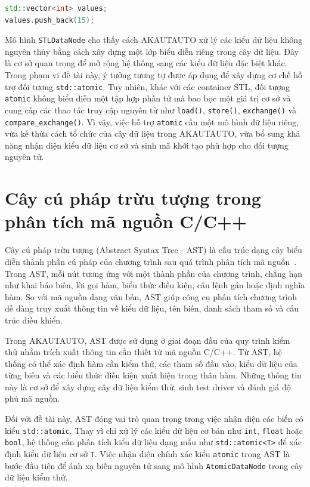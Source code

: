 \begin{lstlisting}[language=C++,caption={Ví dụ mã khởi tạo dữ liệu kiểm thử cho vector},label={lst:stl_vector_init}]
std::vector<int> values;
values.push_back(15);
\end{lstlisting}

Mô hình \texttt{STLDataNode} cho thấy cách AKAUTAUTO xử lý các kiểu dữ liệu không nguyên thủy bằng cách xây dựng một lớp biểu diễn riêng trong cây dữ liệu. Đây là cơ sở quan trọng để mở rộng hệ thống sang các kiểu dữ liệu đặc biệt khác. Trong phạm vi đề tài này, ý tưởng tương tự được áp dụng để xây dựng cơ chế hỗ trợ đối tượng \texttt{std::atomic}. Tuy nhiên, khác với các container STL, đối tượng \texttt{atomic} không biểu diễn một tập hợp phần tử mà bao bọc một giá trị cơ sở và cung cấp các thao tác truy cập nguyên tử như \texttt{load()}, \texttt{store()}, \texttt{exchange()} và \texttt{compare\_exchange()}. Vì vậy, việc hỗ trợ \texttt{atomic} cần một mô hình dữ liệu riêng, vừa kế thừa cách tổ chức của cây dữ liệu trong AKAUTAUTO, vừa bổ sung khả năng nhận diện kiểu dữ liệu cơ sở và sinh mã khởi tạo phù hợp cho đối tượng nguyên tử.

\section{Cây cú pháp trừu tượng trong phân tích mã nguồn C/C++}

Cây cú pháp trừu tượng (Abstract Syntax Tree - AST) là cấu trúc dạng cây biểu diễn thành phần cú pháp của chương trình sau quá trình phân tích mã nguồn~\cite{phamngochung2014ut}. Trong AST, mỗi nút tương ứng với một thành phần của chương trình, chẳng hạn như khai báo biến, lời gọi hàm, biểu thức điều kiện, câu lệnh gán hoặc định nghĩa hàm. So với mã nguồn dạng văn bản, AST giúp công cụ phân tích chương trình dễ dàng truy xuất thông tin về kiểu dữ liệu, tên biến, danh sách tham số và cấu trúc điều khiển.

Trong AKAUTAUTO, AST được sử dụng ở giai đoạn đầu của quy trình kiểm thử nhằm trích xuất thông tin cần thiết từ mã nguồn C/C++. Từ AST, hệ thống có thể xác định hàm cần kiểm thử, các tham số đầu vào, kiểu dữ liệu của từng biến và các biểu thức điều kiện xuất hiện trong thân hàm. Những thông tin này là cơ sở để xây dựng cây dữ liệu kiểm thử, sinh test driver và đánh giá độ phủ mã nguồn.

Đối với đề tài này, AST đóng vai trò quan trọng trong việc nhận diện các biến có kiểu \texttt{std::atomic}. Thay vì chỉ xử lý các kiểu dữ liệu cơ bản như \texttt{int}, \texttt{float} hoặc \texttt{bool}, hệ thống cần phân tích kiểu dữ liệu dạng mẫu như \texttt{std::atomic<T>} để xác định kiểu dữ liệu cơ sở \texttt{T}. Việc nhận diện chính xác kiểu \texttt{atomic} trong AST là bước đầu tiên để ánh xạ biến nguyên tử sang mô hình \texttt{AtomicDataNode} trong cây dữ liệu kiểm thử.

